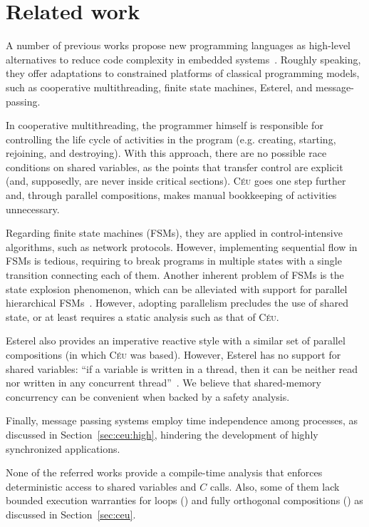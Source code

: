 \documentclass{sig-alternate}
\newcommand{\2}{\;\;}
\newcommand{\5}{\;\;\;\;\;}
\newcommand{\CEU}{\textsc{C\'{e}u}}
\begin{document}
\newpage
\section{Related work}
\label{sec:related}

A number of previous works propose new programming languages as high-level 
alternatives to reduce code complexity in embedded 
systems~\cite{wsn.protothreads,wsn.osm,wsn.sol,arduino.occam}.
Roughly speaking, they offer adaptations to constrained platforms of classical 
programming models, such as cooperative multithreading, finite state machines, 
Esterel, and message-passing.

In cooperative multithreading, the programmer himself is responsible for 
controlling the life cycle of activities in the program (e.g. creating, 
starting, rejoining, and destroying).
With this approach, there are no possible race conditions on shared variables, 
as the points that transfer control are explicit (and, supposedly, are never 
inside critical sections).
\CEU{} goes one step further and, through parallel compositions, makes manual 
bookkeeping of activities unnecessary.

Regarding finite state machines (FSMs), they are applied in control-intensive 
algorithms, such as network protocols.
However, implementing sequential flow in FSMs is tedious, requiring to break 
programs in multiple states with a single transition connecting each of them.
Another inherent problem of FSMs is the state explosion phenomenon, which can 
be alleviated with support for parallel hierarchical FSMs~\cite{wsn.osm}.
However, adopting parallelism precludes the use of shared state, or at least 
requires a static analysis such as that of \CEU{}.

Esterel also provides an imperative reactive style with a similar set of 
parallel compositions (in which \CEU{} was based).
However, Esterel has no support for shared variables: ``if a variable is 
written in a thread, then it can be neither read nor written in any concurrent 
thread''~\cite{esterel.primer}.
We believe that shared-memory concurrency can be convenient when backed by a 
safety analysis.

Finally, message passing systems employ time independence among processes, as 
discussed in Section~\ref{sec:ceu:high}, hindering the development of highly 
synchronized applications.

None of the referred works provide a compile-time analysis that enforces 
deterministic access to shared variables and $C$ calls.
Also, some of them lack bounded execution warranties for loops 
(\cite{wsn.protothreads,wsn.sol,wsn.osm}) and fully orthogonal compositions 
(\cite{wsn.protothreads,arduino.occam}) as discussed in Section~\ref{sec:ceu}.
\end{document}
